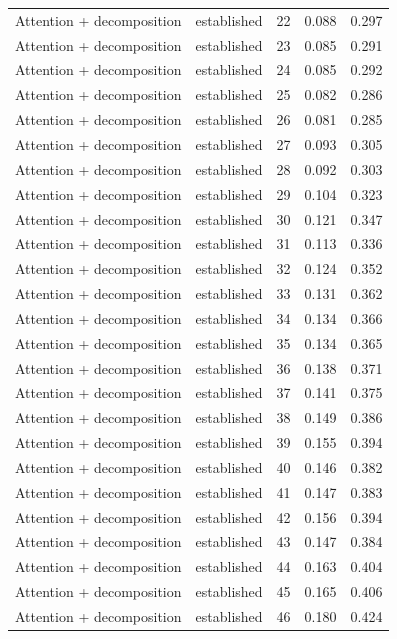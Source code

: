 \begin{tabular}{llrrr}
Attention + decomposition & established & 22 & 0.088 & 0.297 \\
Attention + decomposition & established & 23 & 0.085 & 0.291 \\
Attention + decomposition & established & 24 & 0.085 & 0.292 \\
Attention + decomposition & established & 25 & 0.082 & 0.286 \\
Attention + decomposition & established & 26 & 0.081 & 0.285 \\
Attention + decomposition & established & 27 & 0.093 & 0.305 \\
Attention + decomposition & established & 28 & 0.092 & 0.303 \\
Attention + decomposition & established & 29 & 0.104 & 0.323 \\
Attention + decomposition & established & 30 & 0.121 & 0.347 \\
Attention + decomposition & established & 31 & 0.113 & 0.336 \\
Attention + decomposition & established & 32 & 0.124 & 0.352 \\
Attention + decomposition & established & 33 & 0.131 & 0.362 \\
Attention + decomposition & established & 34 & 0.134 & 0.366 \\
Attention + decomposition & established & 35 & 0.134 & 0.365 \\
Attention + decomposition & established & 36 & 0.138 & 0.371 \\
Attention + decomposition & established & 37 & 0.141 & 0.375 \\
Attention + decomposition & established & 38 & 0.149 & 0.386 \\
Attention + decomposition & established & 39 & 0.155 & 0.394 \\
Attention + decomposition & established & 40 & 0.146 & 0.382 \\
Attention + decomposition & established & 41 & 0.147 & 0.383 \\
Attention + decomposition & established & 42 & 0.156 & 0.394 \\
Attention + decomposition & established & 43 & 0.147 & 0.384 \\
Attention + decomposition & established & 44 & 0.163 & 0.404 \\
Attention + decomposition & established & 45 & 0.165 & 0.406 \\
Attention + decomposition & established & 46 & 0.180 & 0.424 \\

\end{tabular}
